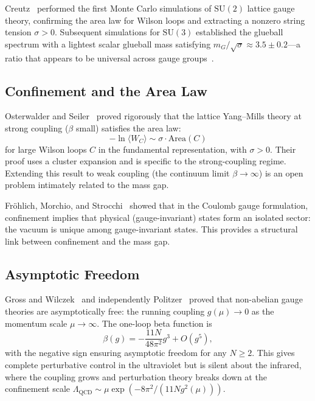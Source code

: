 \documentclass[11pt]{article}
\begin{document}
Creutz~\cite{Creutz} performed the first Monte Carlo simulations of
$\mathrm{SU}(2)$ lattice gauge theory, confirming the area law for
Wilson loops and extracting a nonzero string tension $\sigma > 0$.
Subsequent simulations for $\mathrm{SU}(3)$ established the glueball
spectrum with a lightest scalar glueball mass satisfying
$m_G / \sqrt{\sigma} \approx 3.5 \pm 0.2$---a ratio that appears to
be universal across gauge groups~\cite{Teper,LM}.

\subsection{Confinement and the Area Law}

Osterwalder and Seiler~\cite{OS} proved rigorously that the lattice
Yang--Mills theory at strong coupling ($\beta$ small) satisfies
the area law:
\begin{equation}\label{eq:area-law}
  -\ln \langle W_C \rangle \sim \sigma \cdot \mathrm{Area}(C)
\end{equation}
for large Wilson loops $C$ in the fundamental representation, with
$\sigma > 0$.  Their proof uses a cluster expansion and is specific
to the strong-coupling regime.  Extending this result to weak coupling
(the continuum limit $\beta \to \infty$) is an open problem intimately
related to the mass gap.

Fr\"ohlich, Morchio, and Strocchi~\cite{FMS} showed that in the
Coulomb gauge formulation, confinement implies that physical
(gauge-invariant) states form an isolated sector: the vacuum is
unique among gauge-invariant states.  This provides a structural link
between confinement and the mass gap.

\subsection{Asymptotic Freedom}

Gross and Wilczek~\cite{GW} and independently Politzer~\cite{Pol}
proved that non-abelian gauge theories are asymptotically free: the
running coupling $g(\mu) \to 0$ as the momentum scale $\mu \to \infty$.
The one-loop beta function is
\begin{equation}\label{eq:beta-function}
  \beta(g) = -\frac{11 N}{48\pi^2} g^3 + O(g^5),
\end{equation}
with the negative sign ensuring asymptotic freedom for any $N \geq 2$.
This gives complete perturbative control in the ultraviolet but is
silent about the infrared, where the coupling grows and perturbation
theory breaks down at the confinement scale
$\Lambda_{\mathrm{QCD}} \sim \mu \exp(-8\pi^2 / (11 N g^2(\mu)))$.
\end{document}
